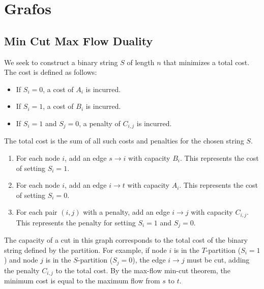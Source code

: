 \section{Grafos}

\subsection{Min Cut Max Flow Duality}
We seek to construct a binary string $S$ of length $n$ that minimizes a total cost. The cost is defined as follows:
\begin{itemize}
    \item If $S_i=0$, a cost of $A_i$ is incurred.
    \item If $S_i=1$, a cost of $B_i$ is incurred.
    \item If $S_i=1$ and $S_j=0$, a penalty of $C_{i,j}$ is incurred.
\end{itemize}
The total cost is the sum of all such costs and penalties for the chosen string $S$.
\begin{enumerate}
    \item For each node $i$, add an edge $s \to i$ with capacity $B_i$. This represents the cost of setting $S_i=1$.
    \item For each node $i$, add an edge $i \to t$ with capacity $A_i$. This represents the cost of setting $S_i=0$.
    \item For each pair $(i, j)$ with a penalty, add an edge $i \to j$ with capacity $C_{i,j}$. This represents the penalty for setting $S_i=1$ and $S_j=0$.
\end{enumerate}

The capacity of a cut in this graph corresponds to the total cost of the binary string defined by the partition. For example, if node $i$ is in the $T$-partition ($S_i=1$) and node $j$ is in the $S$-partition ($S_j=0$), the edge $i \to j$ must be cut, adding the penalty $C_{i,j}$ to the total cost. By the max-flow min-cut theorem, the minimum cost is equal to the maximum flow from $s$ to $t$.
